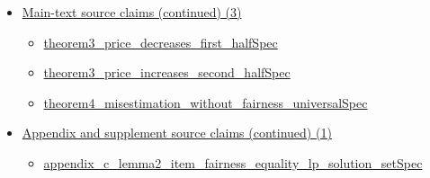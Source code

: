 \documentclass[10pt]{article}
\begin{document}
\begin{itemize}[leftmargin=1.2em]
\begin{itemize}[leftmargin=1.2em]
\item \hyperlink{source-claim-090419aeb8d7a8b0}{appendix\_\allowbreak{}e\_\allowbreak{}lemma13\_\allowbreak{}every\_\allowbreak{}optimal\_\allowbreak{}basic\_\allowbreak{}solution\_\allowbreak{}has\_\allowbreak{}pivot\_\allowbreak{}support\allowbreak{}Spec}
\item \hyperlink{source-claim-053b388150665c75}{appendix\_\allowbreak{}e\_\allowbreak{}lemma14\_\allowbreak{}problem11\_\allowbreak{}has\_\allowbreak{}unique\_\allowbreak{}optimal\_\allowbreak{}solution\allowbreak{}Spec}
\item \hyperlink{source-claim-2442d32f650b179f}{appendix\_\allowbreak{}e\_\allowbreak{}lemma15\_\allowbreak{}optimal\_\allowbreak{}solution\_\allowbreak{}full\_\allowbreak{}closed\_\allowbreak{}form\allowbreak{}Spec}
\item \hyperlink{source-claim-fa20503a4cc73d27}{appendix\_\allowbreak{}e\_\allowbreak{}lemma16\_\allowbreak{}midpoint\_\allowbreak{}order\_\allowbreak{}algebra\allowbreak{}Spec}
\item \hyperlink{source-claim-cac20912e50cfdb7}{appendix\_\allowbreak{}e\_\allowbreak{}lemma17\_\allowbreak{}every\_\allowbreak{}optimal\_\allowbreak{}solution\_\allowbreak{}has\_\allowbreak{}no\_\allowbreak{}right\_\allowbreak{}half\_\allowbreak{}support\allowbreak{}Spec}
\end{itemize}
\item \hyperlink{source-section-c08c7eca66416a2f}{Main-text source claims (continued) (3)}
\begin{itemize}[leftmargin=1.2em]
\item \hyperlink{source-claim-b8bc7fe7622f9901}{theorem3\_\allowbreak{}price\_\allowbreak{}decreases\_\allowbreak{}first\_\allowbreak{}half\allowbreak{}Spec}
\item \hyperlink{source-claim-9cd33ed0f79952fe}{theorem3\_\allowbreak{}price\_\allowbreak{}increases\_\allowbreak{}second\_\allowbreak{}half\allowbreak{}Spec}
\item \hyperlink{source-claim-d63dd1782000f9f6}{theorem4\_\allowbreak{}misestimation\_\allowbreak{}without\_\allowbreak{}fairness\_\allowbreak{}universal\allowbreak{}Spec}
\end{itemize}
\item \hyperlink{source-section-ff6e74b6c8cd2005}{Appendix and supplement source claims (continued) (1)}
\begin{itemize}[leftmargin=1.2em]
\item \hyperlink{source-claim-dd1e59dd74c380a1}{appendix\_\allowbreak{}c\_\allowbreak{}lemma2\_\allowbreak{}item\_\allowbreak{}fairness\_\allowbreak{}equality\_\allowbreak{}lp\_\allowbreak{}solution\_\allowbreak{}set\allowbreak{}Spec}

\end{itemize}
\end{itemize}
\end{document}
